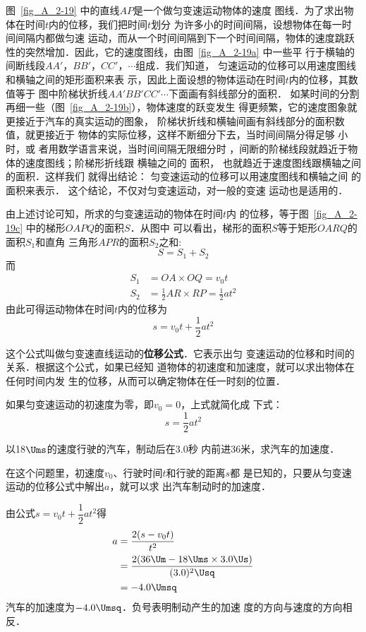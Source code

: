     图~\ref{fig_A_2-19} 中的直线$AP$是一个做匀变速运动物体的速度
图线．为了求出物体在时间$t$内的位移，我们把时间$t$划分
为许多小的时间间隔，设想物体在每一时间间隔内都做匀速
运动，而从一个时间间隔到下一个时间间隔，物体的速度跳跃
性的突然增加．因此，它的速度图线，由图~\ref{fig_A_2-19a} 中一些平
行于横轴的间断线段$AA' $，$ BB' $，$ CC' $，$ \cdots$组成．我们知道，
匀速运动的位移可以用速度图线和横轴之间的矩形面积来表
示，因此上面设想的物体运动在时间$t$内的位移，其数值等于
图中阶梯状折线$AA'BB'CC'\cdots$下面画有斜线部分的面积．
如某时间的分割再细一些（图~\ref{fig_A_2-19b}），物体速度的跃变发生
得更频繁，它的速度图象就更接近于汽车的真实运动的图象，
阶梯状折线和横轴间画有斜线部分的面积数值，就更接近于
物体的实际位移，这样不断细分下去，当时间间隔分得足够
小时，或
者用数学语言来说，当时间间隔无限细分时
，间断的阶梯线段就趋近于物体的速度图线；阶梯形折线跟
横轴之间的
面积，
也就趋近于速度图线跟横轴之间的面积．这样我们
就得出结论：
匀变速运动的位移可以用速度图线和横轴之间
的面积来表示．
这个结论，不仅对匀变速运动，对一般的变速
运动也是适用的．

由上述讨论可知，所求的匀变速运动的物体在时间$t$内
的位移，等于图~\ref{fig_A_2-19c} 中的梯形$OAPQ$的面积$S$．从图中
可以看出，梯形的面积$S$等于矩形$OARQ$的面积$S_1$和直角
三角形$APR$的面积$S_2$之和:
\[S=S_1+S_2\]
而
 \[\begin{split}
S_1&=OA\times OQ=v_0 t\\
S_2&=\frac{1}{2}AR\times RP=\frac{1}{2}at^2
\end{split}\]
由此可得运动物体在时间$t$内的位移为
\[s=v_0t+\frac{1}{2}at^2 \]

    这个公式叫做匀变速直线运动的\textbf{位移公式}．它表示出匀
变速运动的位移和时间的关系．根据这个公式，如果已经知
道物体的初速度和加速度，就可以求出物体在任何时间内发
生的位移，从而可以确定物体在任一时刻的位置．

    如果匀变速运动的初速度为零，即$v_0=0$，上式就简化成
下式：
\[s=\frac{1}{2}at^2  \]

\begin{example}
以18$\Ums$的速度行驶的汽车，制动后在3.0秒
内前进36米，求汽车的加速度．
\end{example}

\begin{solution}
    在这个问题里，初速度$v_0$、行驶时间$t$和行驶的距离$s$都
是已知的，只要从匀变速运动的位移公式中解出$a$，就可以求
出汽车制动时的加速度．

由公式$s=v_0t+\dfrac{1}{2}at^2$得
\[\begin{split}
a&=\frac{2(s-v_0t)}{t^2}\\
&=\frac{2(36 \Um -18\Ums\times 3.0 \Us )}{(3.0)^2 \Usq}\\
&=-4.0\Umsq
\end{split} \]
    汽车的加速度为$-4.0\Umsq$．负号表明制动产生的加速
度的方向与速度的方向相反．

\end{solution}

